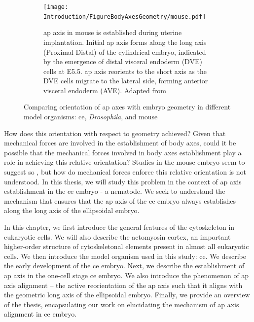 \begin{figure}[p]
\begin{subfigure}{\textwidth}
\end{subfigure}
\hfill
\begin{subfigure}{\textwidth}
    \centering
    \texttt{[image: Introduction/FigureBodyAxesGeometry/mouse.pdf]}
    \caption{\acs{ap} axis in mouse is established during uterine implantation. Initial \acs{ap} axis forms along the long axis (Proximal-Distal) of the cylindrical embryo, indicated by the emergence of distal visceral endoderm (DVE) cells at E5.5. \acs{ap} axis reorients to the short axis as the DVE cells migrate to the lateral side, forming anterior visceral endoderm (AVE). Adapted from \cite{matsuo2017mechanical}}
    \label{subfig:compareBodyAxesEmbryoGeometry-apAxisMouse}
\end{subfigure}

\caption[Comparing orientation of \acs{ap} axis with geometry]{Comparing orientation of \acs{ap} axes with embryo geometry in different model organisms: \acs{ce}, \textit{Drosophila}, and mouse}
\label{fig:compareBodyAxesEmbryoGeometry}

\end{figure}

How does this orientation with respect to geometry achieved? Given that mechanical forces are involved in the establishment of body axes, could it be possible that the mechanical forces involved in body axes establishment play a role in achieving this relative orientation? Studies in the mouse embryo seem to suggest so \citep{vianello2019understanding,hiramatsu2013external,matsuo2017mechanical}, but how do mechanical forces enforce this relative orientation is not understood. In this thesis, we will study this problem in the context of \ac{ap} axis establishment in the \ac{ce} embryo - a nematode. We seek to understand the mechanism that ensures that the \ac{ap} axis of the \ac{ce} embryo always establishes along the long axis of the ellipsoidal embryo. 

In this chapter, we first introduce the general features of the cytoskeleton in eukaryotic cells. We will also describe the actomyosin cortex, an important higher-order structure of cytoskeletonal elements present in almost all eukaryotic cells. We then introduce the model organism used in this study: \ac{ce}. We describe the early development of the \ac{ce} embryo. Next, we describe the establishment of \ac{ap} axis in the one-cell stage \ac{ce} embryo. We also introduce the phenomenon of \ac{ap} axis alignment -- the active reorientation of the \ac{ap} axis such that it aligns with the geometric long axis of the ellipsoidal embryo. Finally, we provide an overview of the thesis, encapsulating our work on elucidating the mechanism of \ac{ap} axis alignment in \ac{ce} embryo.

